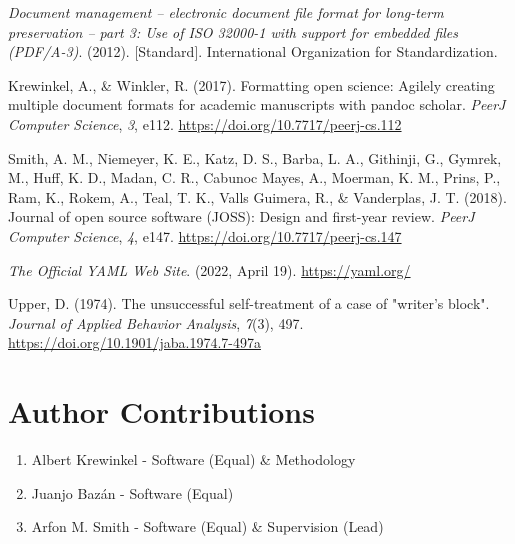 \documentclass[10pt,a4paper,onecolumn]{article}
\newlength{\cslhangindent}
\newenvironment{CSLReferences}[2] %
 {\begin{list}{}{%
  \setlength{\itemindent}{0pt}
  \setlength{\leftmargin}{0pt}
  \setlength{\parsep}{0pt}
  \ifodd #1
   \setlength{\leftmargin}{\cslhangindent}
   \setlength{\itemindent}{-1\cslhangindent}
  \fi
  \setlength{\itemsep}{#2\baselineskip}}}
 {\end{list}}
\begin{document}
\protect{}\label{refs}
\begin{CSLReferences}{1}{0.5}
\emph{Document management -- electronic document file format for
long-term preservation -- part 3: Use of {ISO} 32000-1 with support for
embedded files ({PDF/A-3})}. (2012). {[}Standard{]}. International
Organization for Standardization.

Krewinkel, A., \& Winkler, R. (2017). Formatting open science: Agilely
creating multiple document formats for academic manuscripts with pandoc
scholar. \emph{PeerJ Computer Science}, \emph{3}, e112.
\url{https://doi.org/10.7717/peerj-cs.112}

Smith, A. M., Niemeyer, K. E., Katz, D. S., Barba, L. A., Githinji, G.,
Gymrek, M., Huff, K. D., Madan, C. R., Cabunoc Mayes, A., Moerman, K.
M., Prins, P., Ram, K., Rokem, A., Teal, T. K., Valls Guimera, R., \&
Vanderplas, J. T. (2018). Journal of open source software (JOSS): Design
and first-year review. \emph{PeerJ Computer Science}, \emph{4}, e147.
\url{https://doi.org/10.7717/peerj-cs.147}

\emph{The {Official YAML Web Site}}. (2022, April 19).
\url{https://yaml.org/}

Upper, D. (1974). The unsuccessful self-treatment of a case of "writer's
block". \emph{Journal of Applied Behavior Analysis}, \emph{7}(3), 497.
\url{https://doi.org/10.1901/jaba.1974.7-497a}

\end{CSLReferences}

\section{Author Contributions}\label{author-contributions}
\begin{enumerate}
\item Albert Krewinkel - Software (Equal) & Methodology
\item Juanjo Bazán - Software (Equal)
\item Arfon M. Smith - Software (Equal) & Supervision (Lead)
\end{enumerate}
\end{document}
